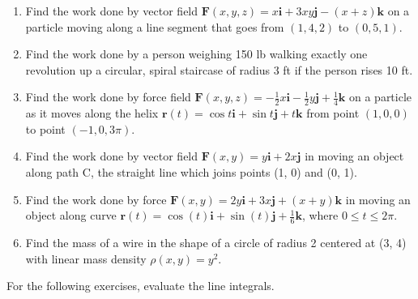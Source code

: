 \documentclass{exercises}
\begin{document}
\begin{enumerate}[resume]
\item Find the work done by vector field $\mathbf{F}(x,y,z)=x\mathbf{i}+3xy\mathbf{j}-(x+z)\mathbf{k}$ on a particle moving along a line segment that goes from $(1,4,2)$ to $(0,5,1)$.
\item Find the work done by a person weighing 150 lb walking exactly one revolution up a circular, spiral staircase of radius 3 ft if the person rises 10 ft.
\item Find the work done by force field $\mathbf{F}(x,y,z)=-\frac{1}{2}x\mathbf{i}-\frac{1}{2}y\mathbf{j}+\frac{1}{4}\mathbf{k}$ on a particle as it moves along the helix $\mathbf{r}(t)=\cos t\mathbf{i}+\sin t\mathbf{j}+t\mathbf{k}$ from point $(1,0,0)$ to point $(-1,0,3\pi)$.
\item Find the work done by vector field $\mathbf{F}(x,y)=y\mathbf{i}+2x\mathbf{j}$ in moving an object along path C, the straight line which joins points (1, 0) and (0, 1).
\item Find the work done by force $\mathbf{F}(x,y)=2y\mathbf{i}+3x\mathbf{j}+(x+y)\mathbf{k}$ in moving an object along curve $\mathbf{r}(t)=\cos(t)\mathbf{i}+\sin(t)\mathbf{j}+\frac{1}{6}\mathbf{k}$, where $0\le t\le2\pi$.
\item Find the mass of a wire in the shape of a circle of radius 2 centered at (3, 4) with linear mass density $\rho(x,y)=y^{2}$.
\end{enumerate}

For the following exercises, evaluate the line integrals.
\end{document}
